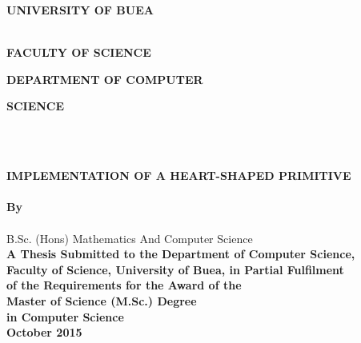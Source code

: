 \documentclass[11pt, oneside]{Thesis} %
\title{\ttitle} %
\begin{document}
\frontmatter %

\begin{titlepage}
\begin{center}
\textsc{\Large \textbf{UNIVERSITY OF BUEA}}\\[25pt]\\[2.5cm] %
\end{center}

\begin{minipage}{0.5\textwidth}
\begin{flushleft}
\large\textbf{FACULTY OF SCIENCE}
\end{flushleft}
\end{minipage}
\begin{minipage}{0.5\textwidth}
\begin{flushright}
\large\textbf{DEPARTMENT OF COMPUTER}
\end{flushright}
\end{minipage}

\large \hspace{290} \textbf{SCIENCE} 

\hspace{200}\\

\begin{center}
\\[0.5cm]
{\large \bfseries IMPLEMENTATION OF A HEART-SHAPED PRIMITIVE}\\[0.4cm] %
\\[2.5cm]

\large \textbf{ By } \\[2.0cm]

\Large \textbf{\authornames} \\ 

\small B.Sc. (Hons) Mathematics And Computer Science \\[2.0cm]

\large \textbf{A Thesis Submitted to the Department of Computer Science, \\
		Faculty of Science, University of Buea, in Partial Fulfilment \\ 
		of the Requirements for the Award of the \\
		Master of Science (M.Sc.) Degree \\
		in Computer Science}\\[2.5cm]

\large \textbf{October 2015}

\end{center}

\end{titlepage}
\end{document}
